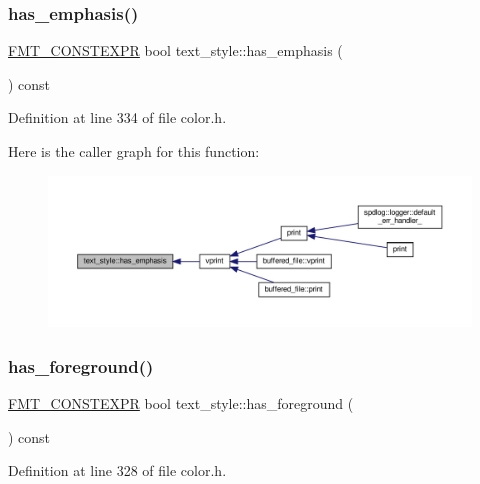 \subsubsection{\texorpdfstring{has\+\_\+emphasis()}{has\_emphasis()}}
{\footnotesize\ttfamily \hyperlink{core_8h_a69201cb276383873487bf68b4ef8b4cd}{F\+M\+T\+\_\+\+C\+O\+N\+S\+T\+E\+X\+PR} bool text\+\_\+style\+::has\+\_\+emphasis (\begin{DoxyParamCaption}{ }\end{DoxyParamCaption}) const\hspace{0.3cm}{\ttfamily [inline]}}



Definition at line 334 of file color.\+h.

Here is the caller graph for this function\+:
\nopagebreak
\begin{figure}[H]
\begin{center}
\leavevmode
\includegraphics[width=350pt]{classtext__style_a57443deabb81d0e013d81813fc4d55cb_icgraph}
\end{center}
\end{figure}
\mbox{\label{classtext__style_ad605ce62796a99d87f0e9744617cf402}} 
\subsubsection{\texorpdfstring{has\+\_\+foreground()}{has\_foreground()}}
{\footnotesize\ttfamily \hyperlink{core_8h_a69201cb276383873487bf68b4ef8b4cd}{F\+M\+T\+\_\+\+C\+O\+N\+S\+T\+E\+X\+PR} bool text\+\_\+style\+::has\+\_\+foreground (\begin{DoxyParamCaption}{ }\end{DoxyParamCaption}) const\hspace{0.3cm}{\ttfamily [inline]}}



Definition at line 328 of file color.\+h.

